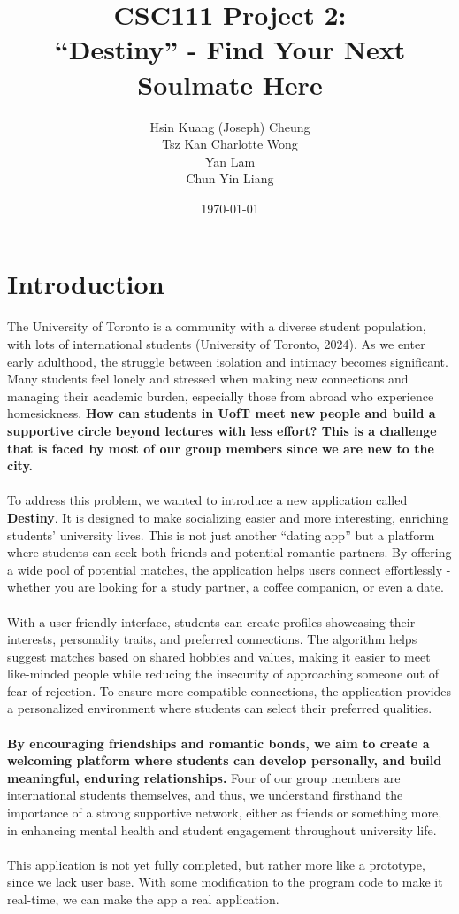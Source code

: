 \documentclass[fontsize=11pt]{article}
\title{CSC111 Project 2: \\ \textbf{“Destiny” - Find Your Next Soulmate Here}}
\author{Hsin Kuang (Joseph) Cheung \\ Tsz Kan Charlotte Wong \\ Yan Lam \\ Chun Yin Liang}
\date{\today}
\begin{document}
\maketitle

\section{Introduction}

The University of Toronto is a community with a diverse student population, with lots of international students (University of Toronto, 2024).
As we enter early adulthood, the struggle between isolation and intimacy becomes significant.
Many students feel lonely and stressed when making new connections and managing their academic burden, especially those from abroad who experience homesickness.
\textbf{How can students in UofT meet new people and build a supportive circle beyond lectures with less effort?
This is a challenge that is faced by most of our group members since we are new to the city.}
\\
\\
To address this problem, we wanted to introduce a new application called \textbf{Destiny}.
It is designed to make socializing easier and more interesting, enriching students’ university lives.
This is not just another “dating app” but a platform where students can seek both friends and potential romantic partners. By offering a wide pool of potential matches, the application helps users connect effortlessly - whether you are looking for a study partner, a coffee companion, or even a date.
\\
\\
With a user-friendly interface, students can create profiles showcasing their interests, personality traits, and preferred connections.
The algorithm helps suggest matches based on shared hobbies and values, making it easier to meet like-minded people while
reducing the insecurity of approaching someone out of fear of rejection.
To ensure more compatible connections, the application provides a personalized environment where students can select their preferred qualities.
\\
\\
\textbf{By encouraging friendships and romantic bonds, we aim to create a welcoming platform where students can develop personally, and build meaningful, enduring relationships.}
Four of our group members are international students themselves, and thus, we understand firsthand the importance of a strong supportive network, either as friends or something more, in enhancing mental health and student engagement throughout university life.
\\
\\
This application is not yet fully completed, but rather more like a prototype, since we lack user base.
With some modification to the program code to make it real-time, we can make the app a real application.
\end{document}
